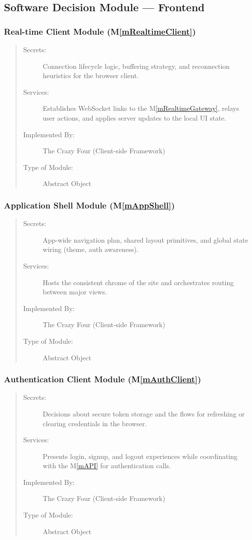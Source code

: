 \documentclass[12pt, titlepage]{article}
\newcommand{\mref}[1]{M\ref{#1}}
\begin{document}
\subsection{Software Decision Module --- Frontend}

\subsubsection{Real-time Client Module (\mref{mRealtimeClient})}
\begin{quote}
\begin{description}
  \item[Secrets:] Connection lifecycle logic, buffering strategy, and reconnection heuristics for the browser client.
  \item[Services:] Establishes WebSocket links to the \mref{mRealtimeGateway}, relays user actions, and applies server updates to the local UI state.
  \item[Implemented By:] The Crazy Four (Client-side Framework)
  \item[Type of Module:] Abstract Object
\end{description}
\end{quote}

\subsubsection{Application Shell Module (\mref{mAppShell})}
\begin{quote}
\begin{description}
  \item[Secrets:] App-wide navigation plan, shared layout primitives, and global state wiring (theme, auth awareness).
  \item[Services:] Hosts the consistent chrome of the site and orchestrates routing between major views.
  \item[Implemented By:] The Crazy Four (Client-side Framework)
  \item[Type of Module:] Abstract Object
\end{description}
\end{quote}

\subsubsection{Authentication Client Module (\mref{mAuthClient})}
\begin{quote}
\begin{description}
  \item[Secrets:] Decisions about secure token storage and the flows for refreshing or clearing credentials in the browser.
  \item[Services:] Presents login, signup, and logout experiences while coordinating with the \mref{mAPI} for authentication calls.
  \item[Implemented By:] The Crazy Four (Client-side Framework)
  \item[Type of Module:] Abstract Object
\end{description}
\end{quote}
\end{document}
